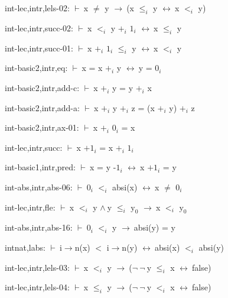 \documentclass[a4paper]{article}
\newcommand{\Fol}{\mbox{$\vdash\ $}}
\newcommand{\Not}{\mbox{$\neg\ $}}
\newcommand{\And}{\mbox{$\wedge\ $}}
\newcommand{\Imp}{\mbox{$\rightarrow\ $}}
\newcommand{\Equiv}{\mbox{$\leftrightarrow\ $}}
\begin{document}
int-lec,intr,lels-02: 
 \Fol x $\neq$ y \Imp (x $\mbox{$\le$}_{i}$ y \Equiv x $\mbox{$<$}_{i}$ y)



int-lec,intr,succ-02: 
 \Fol x $\mbox{$<$}_{i}$ y $\mbox{+}_{i}$ $\mbox{1}_{i}$ \Equiv x $\mbox{$\le$}_{i}$ y



int-lec,intr,succ-01: 
 \Fol x $\mbox{+}_{i}$ $\mbox{1}_{i}$ $\mbox{$\le$}_{i}$ y \Equiv x $\mbox{$<$}_{i}$ y



int-basic2,intr,eq: 
 \Fol x = x $\mbox{+}_{i}$ y \Equiv y = $\mbox{0}_{i}$



int-basic2,intr,add-c: 
 \Fol x $\mbox{+}_{i}$ y = y $\mbox{+}_{i}$ x



int-basic2,intr,add-a: 
 \Fol x $\mbox{+}_{i}$ y $\mbox{+}_{i}$ z = (x $\mbox{+}_{i}$ y) $\mbox{+}_{i}$ z



int-basic2,intr,ax-01: 
 \Fol x $\mbox{+}_{i}$ $\mbox{0}_{i}$ = x



int-lec,intr,succ: 
 \Fol x $\mbox{+1}_{i}$ = x $\mbox{+}_{i}$ $\mbox{1}_{i}$



int-basic1,intr,pred: 
 \Fol x = y $\mbox{-1}_{i}$ \Equiv x $\mbox{+1}_{i}$ = y



int-abs,intr,abs-06: 
 \Fol $\mbox{0}_{i}$ $\mbox{$<$}_{i}$ absi(x) \Equiv x $\neq$ $\mbox{0}_{i}$



int-lec,intr,fle: 
 \Fol x $\mbox{$<$}_{i}$ y \And y $\mbox{$\le$}_{i}$ $\mbox{y}_{0}$ \Imp x $\mbox{$<$}_{i}$ $\mbox{y}_{0}$



int-abs,intr,abs-16: 
 \Fol $\mbox{0}_{i}$ $\mbox{$<$}_{i}$ y \Imp absi(y) = y



intnat,labs: 
 \Fol i$\to$n(x) $<$ i$\to$n(y) \Equiv absi(x) $\mbox{$<$}_{i}$ absi(y)



int-lec,intr,lels-03: 
 \Fol x $\mbox{$<$}_{i}$ y \Imp (\Not \Not y $\mbox{$\le$}_{i}$ x \Equiv false)



int-lec,intr,lels-04: 
 \Fol x $\mbox{$\le$}_{i}$ y \Imp (\Not \Not y $\mbox{$<$}_{i}$ x \Equiv false)
\end{document}
